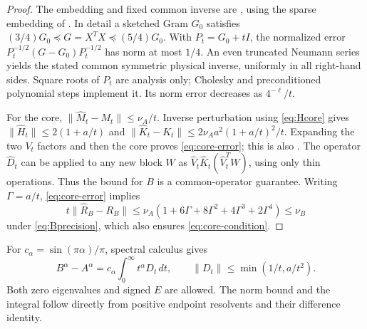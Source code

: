\documentclass[11pt]{article}
\numberwithin{equation}{section}
\begin{document}
\begin{proof}
The embedding and fixed common inverse are \cite[Section~3]{Raw},
using the sparse embedding of \cite[Theorem~9]{NN}. In detail a
sketched Gram $G_0$ satisfies
$(3/4)G_0\preceq G=X^TX\preceq(5/4)G_0$. With $P_t=G_0+tI$,
the normalized error $P_t^{-1/2}(G-G_0)P_t^{-1/2}$ has norm at most
$1/4$. An even truncated Neumann series yields the stated common
symmetric physical inverse, uniformly in all right-hand sides. Square
roots of $P_t$ are analysis only; Cholesky and preconditioned polynomial
steps implement it. Its norm error decreases as $4^{-\ell}/t$.

For the core, $\|\widehat M_t-M_t\|\le\nu_A/t$. Inverse
perturbation using \eqref{eq:Hcore} gives
$\|\widehat H_t\|\le2(1+a/t)$ and
$\|\widehat K_t-K_t\|\le2\nu_Aa^2(1+a/t)^2/t$.
Expanding the two $V_t$ factors and then the core proves
\eqref{eq:core-error}; this is also \cite[Lemma~2.1]{Raw}.
The operator $\widehat D_t$ can be applied to any new block $W$ as
$\widehat V_t\widehat K_t(\widehat V_t^TW)$, using only thin
operations. Thus the bound for $B$ is a common-operator guarantee.
Writing $\Gamma=a/t$, \eqref{eq:core-error} implies
\[
 t\|\widehat R_B-R_B\|
 \le\nu_A(1+6\Gamma+8\Gamma^2+4\Gamma^3+2\Gamma^4)
 \le\nu_B
\]
under \eqref{eq:Bprecision}, which also ensures
\eqref{eq:core-condition}.
\end{proof}

For $c_\alpha=\sin(\pi\alpha)/\pi$, spectral calculus gives
\begin{equation}\label{eq:frac-integral}
 B^\alpha-A^\alpha=c_\alpha\int_0^\infty t^\alpha D_t\,dt,
 \qquad \|D_t\|\le\min(1/t,a/t^2).
\end{equation}
Both zero eigenvalues and signed $E$ are allowed. The norm bound and
the integral follow directly from positive endpoint resolvents and
their difference identity.
\end{document}
